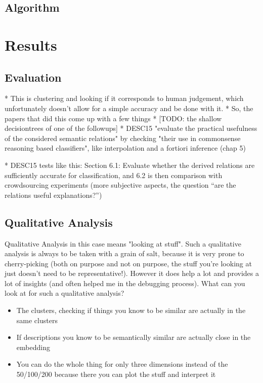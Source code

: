 \documentclass[11pt,
  paper=a4, 
  hidelinks,
  bibliography=totocnumbered,
	captions=tableheading,
	BCOR=10mm
]{scrreprt}
\theoremstyle{definition}
\begin{document}



\section{Algorithm}



\chapter{Results}



	
		
	
	
	


\section{Evaluation} %


* This is clustering and looking if it corresponds to human judgement, which unfortunately doesn't allow for a simple accuracy and be done with it.
* So, the papers that did this come up with a few things
* [TODO: the shallow decisiontrees of one of the followups]
* DESC15 "evaluate the practical usefulness of the considered semantic relations" by checking "their use in commonsense reasoning based classifiers", like interpolation and a fortiori inference (chap 5)


* DESC15 tests like this: Section 6.1: Evaluate whether the derived relations are sufficiently accurate for classification, and 6.2 is then comparison with crowdsourcing experiments (more subjective aspects, the question “are the relations useful explanations?”)



\section{Qualitative Analysis}

Qualitative Analysis in this case means "looking at stuff". Such a qualitative analysis is always to be taken with a grain of salt, because it is very prone to cherry-picking (both on purpose and not on purpose, the stuff you're looking at just doesn't need to be representative!). However it does help a lot and provides a lot of insights (and often helped me in the debugging process).
What can you look at for such a qualitative analysis?
\begin{itemize}
	\item The clusters, checking if things you know to be similar are actually in the same clusters
	\item If descriptions you know to be semantically similar are actually close in the embedding
	\item You can do the whole thing for only three dimensions instead of the 50/100/200 because there you can plot the stuff and interpret it
\end{itemize}
\end{document}
